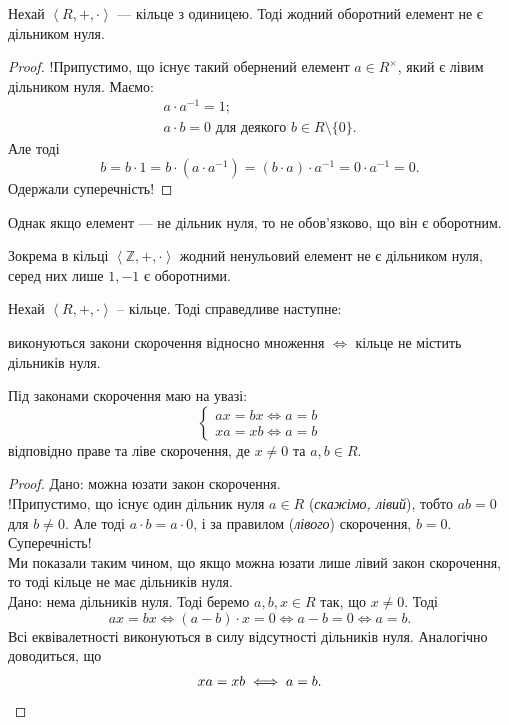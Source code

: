 \documentclass{math_library}
\begin{document}
\begin{theorem}
\label{inverses_are_not_zero_divisors}
Нехай $\left<R,+,\cdot \right>$ --- кільце з одиницею. Тоді жодний оборотний елемент не є дільником нуля.
\end{theorem}

\begin{proof}
!Припустимо, що існує такий обернений елемент $a \in R^\times$, який є лівим дільником нуля. Маємо:
\begin{align*}
a \cdot a^{-1} = 1; \\
a \cdot b = 0 \text{ для деякого $b \in R \setminus \{0\}$}.
\end{align*}
Але тоді 
\[
b = b \cdot 1 = b \cdot (a \cdot a^{-1}) = (b \cdot a) \cdot a^{-1} = 0 \cdot a^{-1} = 0.
\]
Одержали суперечність!
\end{proof}

\begin{remark}
Однак якщо елемент --- не дільник нуля, то не обов'язково, що він є оборотним.
\end{remark}

\begin{example}
Зокрема в кільці $\left< \mathbb{Z},+,\cdot \right>$ жодний ненульовий елемент не є дільником нуля, серед них лише $1,-1$ є оборотними.
\end{example}

\begin{theorem}
Нехай $\left<R,+,\cdot \right>$ -- кільце. Тоді справедливе наступне:
\begin{center}
виконуються закони скорочення відносно множення $\iff$ кільце не містить дільників нуля.
\end{center}
\end{theorem}
Під законами скорочення маю на увазі:
\[
\begin{cases}
ax = bx \iff a = b \\
xa = xb \iff a = b
\end{cases}\]
відповідно праве та ліве скорочення, де $x \neq 0$ та $a,b \in R$.

\begin{proof}
\rightproof Дано: можна юзати закон скорочення.\\
!Припустимо, що існує один дільник нуля $a \in R$ (\textit{скажімо, лівий}), тобто $ab = 0$ для $b \neq 0$. Але тоді $a \cdot b = a \cdot 0$, і за правилом (\textit{лівого}) скорочення, $b = 0$. Суперечність!\\
Ми показали таким чином, що якщо можна юзати лише лівий закон скорочення, то тоді кільце не має дільників нуля.
\bigskip \\
\leftproof Дано: нема дільників нуля. Тоді беремо $a,b,x \in R$ так, що $x \neq 0$. Тоді
\[
ax = bx \iff (a-b) \cdot x = 0 \iff a-b = 0 \iff a = b.
\]
Всі еквівалетності виконуються в силу відсутності дільників нуля.  Аналогічно доводиться, що 
\[
xa = xb \iff a = b. \qedhere
\]
\end{proof}
\end{document}
